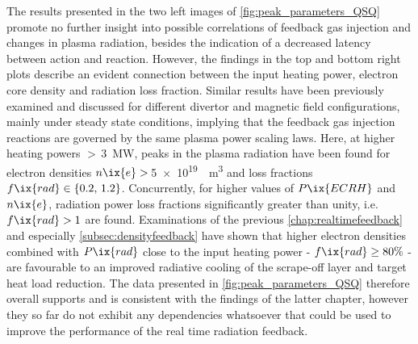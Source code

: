     The results presented in the two left images of \cref{fig:peak_parameters_QSQ} promote no further insight into possible correlations of feedback gas injection and changes in plasma radiation, besides the indication of a decreased latency between action and reaction. However, the findings in the top and bottom right plots describe an evident connection between the input heating power, electron core density and radiation loss fraction. Similar results have been previously examined and discussed for different divertor and magnetic field configurations, mainly under steady state conditions\cite{Klinger2016,Fuchert2018,Zhang2020}, implying that the feedback gas injection reactions are governed by the same plasma power scaling laws. Here, at higher heating powers $>\,$\SI{3}{\mega\watt}, peaks in the plasma radiation have been found for electron densities $n\ix{e}>\,$\SI{5e19}{\per\cubic\meter} and loss fractions $f\ix{rad}\in\left\{0.2,\,1.2\right\}$. Concurrently, for higher values of $P\ix{ECRH}$ and $n\ix{e}$, radiation power loss fractions significantly greater than unity, i.e. $f\ix{rad}>1$ are found. Examinations of the previous \cref{chap:realtimefeedback} and especially \cref{subsec:densityfeedback} have shown that higher electron densities combined with $P\ix{rad}$ close to the input heating power - $f\ix{rad}\ge80\%$ - are favourable to an improved radiative cooling of the scrape-off layer and target heat load reduction. The data presented in \cref{fig:peak_parameters_QSQ} therefore overall supports and is consistent with the findings of the latter chapter, however they so far do not exhibit any dependencies whatsoever that could be used to improve the performance of the real time radiation feedback.%
%

